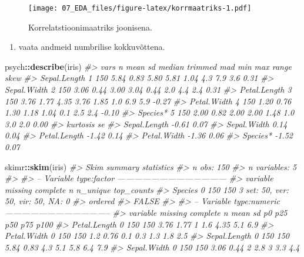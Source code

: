 \documentclass[]{book}
\newenvironment{Shaded}{\begin{snugshade}}{\end{snugshade}}
\newcommand{\KeywordTok}[1]{\textcolor[rgb]{0.13,0.29,0.53}{\textbf{#1}}}
\newcommand{\CommentTok}[1]{\textcolor[rgb]{0.56,0.35,0.01}{\textit{#1}}}
\newcommand{\OperatorTok}[1]{\textcolor[rgb]{0.81,0.36,0.00}{\textbf{#1}}}
\newcommand{\NormalTok}[1]{#1}
\providecommand{\tightlist}{%
  \setlength{\itemsep}{0pt}\setlength{\parskip}{0pt}}
\begin{document}
\begin{figure}
\centering
\texttt{[image: 07\_EDA\_files/figure-latex/korrmaatriks-1.pdf]}
\caption{\label{fig:korrmaatriks}Korrelatstioonimaatriks joonisena.}
\end{figure}

\begin{enumerate}
\def\labelenumi{\arabic{enumi}.}
\setcounter{enumi}{1}
\tightlist
\item
  vaata andmeid numbrilise kokkuvõttena.
\end{enumerate}

\begin{Shaded}
\begin{Highlighting}[]
\NormalTok{psych}\OperatorTok{::}\KeywordTok{describe}\NormalTok{(iris) }
\CommentTok{#>              vars   n mean   sd median trimmed  mad min max range  skew}
\CommentTok{#> Sepal.Length    1 150 5.84 0.83   5.80    5.81 1.04 4.3 7.9   3.6  0.31}
\CommentTok{#> Sepal.Width     2 150 3.06 0.44   3.00    3.04 0.44 2.0 4.4   2.4  0.31}
\CommentTok{#> Petal.Length    3 150 3.76 1.77   4.35    3.76 1.85 1.0 6.9   5.9 -0.27}
\CommentTok{#> Petal.Width     4 150 1.20 0.76   1.30    1.18 1.04 0.1 2.5   2.4 -0.10}
\CommentTok{#> Species*        5 150 2.00 0.82   2.00    2.00 1.48 1.0 3.0   2.0  0.00}
\CommentTok{#>              kurtosis   se}
\CommentTok{#> Sepal.Length    -0.61 0.07}
\CommentTok{#> Sepal.Width      0.14 0.04}
\CommentTok{#> Petal.Length    -1.42 0.14}
\CommentTok{#> Petal.Width     -1.36 0.06}
\CommentTok{#> Species*        -1.52 0.07}
\end{Highlighting}
\end{Shaded}

\begin{Shaded}
\begin{Highlighting}[]
\NormalTok{skimr}\OperatorTok{::}\KeywordTok{skim}\NormalTok{(iris) }
\CommentTok{#> Skim summary statistics}
\CommentTok{#>  n obs: 150 }
\CommentTok{#>  n variables: 5 }
\CommentTok{#> }
\CommentTok{#> -- Variable type:factor ---------------------------------------}
\CommentTok{#>  variable missing complete   n n_unique                       top_counts}
\CommentTok{#>   Species       0      150 150        3 set: 50, ver: 50, vir: 50, NA: 0}
\CommentTok{#>  ordered}
\CommentTok{#>    FALSE}
\CommentTok{#> }
\CommentTok{#> -- Variable type:numeric --------------------------------------}
\CommentTok{#>      variable missing complete   n mean   sd  p0 p25  p50 p75 p100}
\CommentTok{#>  Petal.Length       0      150 150 3.76 1.77 1   1.6 4.35 5.1  6.9}
\CommentTok{#>   Petal.Width       0      150 150 1.2  0.76 0.1 0.3 1.3  1.8  2.5}
\CommentTok{#>  Sepal.Length       0      150 150 5.84 0.83 4.3 5.1 5.8  6.4  7.9}
\CommentTok{#>   Sepal.Width       0      150 150 3.06 0.44 2   2.8 3    3.3  4.4}
\end{Highlighting}
\end{Shaded}
\end{document}
